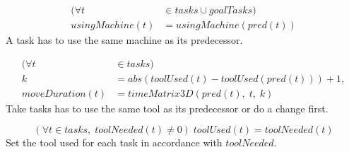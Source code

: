  \begin{equation}\label{eq:115}
 \begin{aligned}
 (\forall t &\in tasks \cup goalTasks) \\
 usingMachine(t) &= usingMachine(pred(t)) 
 \end{aligned}
 \end{equation}
 A task has to use the same machine as its predecessor.
 
 \begin{equation}\label{eq:116}
 \begin{aligned}
 (\forall t &\in tasks) \\
 k &= abs(toolUsed(t) - toolUsed(pred(t))) + 1, \\
 moveDuration(t) &= timeMatrix3D(pred(t), \; t, \; k)
 \end{aligned}
 \end{equation}
 Take tasks has to use the same tool as its predecessor or do a change first.
 
 \begin{equation}\label{eq:117}
 (\forall t \in tasks, \; toolNeeded(t) \neq 0) \; toolUsed(t) = toolNeeded(t)
 \end{equation}
 Set the tool used for each task in accordance with $toolNeeded$.
